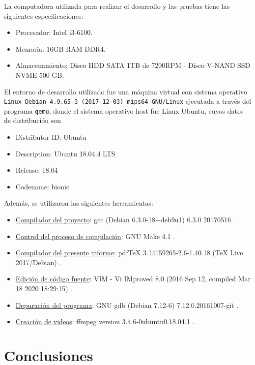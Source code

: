 \documentclass[a4paper,12pt]{article}
\numberwithin{equation}{section}
\numberwithin{figure}{section}
\begin{document}
	La computadora utilizada para realizar el desarrollo y las pruebas tiene las siguientes especificaciones:
	\begin{itemize}
		\item Procesador: Intel i3-6100.
		\item Memoria: 16GB RAM DDR4.
		\item Almacenamiento: Disco HDD SATA 1TB de 7200RPM - Disco V-NAND SSD NVME 500 GB.
	\end{itemize}
	
	El entorno de desarrollo utilizado fue una máquina virtual con sistema operativo \texttt{Linux Debian 4.9.65-3 (2017-12-03) mips64 GNU/Linux} ejecutada a través del programa \texttt{qemu}, donde el sistema operativo host fue Linux Ubuntu, cuyos datos de distribución son
	\begin{itemize}
		\item Distributor ID: Ubuntu
		\item Description: Ubuntu 18.04.4 LTS
		\item Release: 18.04
		\item Codename: bionic
	\end{itemize}
	
	Además, se utilizaron las siguientes herramientas:
	\begin{itemize}
		\item \underline{Compilador del proyecto}: gcc (Debian 6.3.0-18+deb9u1) 6.3.0 20170516 \cite{tool_gcc}.
		\item \underline{Control del proceso de compilación}: GNU Make 4.1 \cite{tool_gnuMake}.
		\item \underline{Compilador del presente informe}: pdfTeX 3.14159265-2.6-1.40.18 (TeX Live 2017/Debian) \cite{tool_latex}.
		\item \underline{Edición de código fuente}: VIM - Vi IMproved 8.0 (2016 Sep 12, compiled Mar 18 2020 18:29:15) \cite{tool_vim}.
		\item \underline{Depuración del programa}: GNU gdb (Debian 7.12-6) 7.12.0.20161007-git \cite{tool_gdb}.
		\item \underline{Creación de videos}: ffmpeg version 3.4.6-0ubuntu0.18.04.1 \cite{tool_ffmpeg}.
	\end{itemize}
	
	\section{Conclusiones}
	
\end{document}
